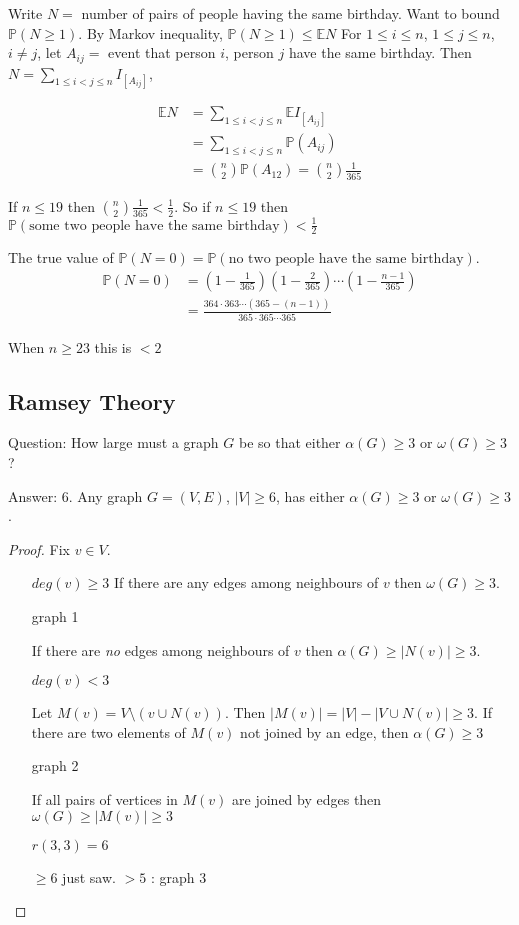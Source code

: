 \documentclass{article}
\begin{document}
Write $N=$ number of pairs of people having the same birthday.  Want to bound $\mathbb{P}(N \ge 1)$.  By Markov inequality, $\mathbb{P}(N \ge 1) \le \mathbb{E}N$  For $1 \le i \le n$, $1\le j \le n$, $i \neq j$, let $A_{ij}=$ event that person $i$, person $j$ have the same birthday.  Then $N = \displaystyle \sum_{1 \le i < j \le n}I_{[A_{ij}]}$, 

\begin{align*}
\mathbb{E}N &=   \sum_{1 \le i < j \le n} \mathbb{E} I_{[A_{ij}]} \\
&= \sum_{1 \le i < j \le n} \mathbb{P}(A_{ij}) \\
& = {n \choose 2} \mathbb{P}(A_{12}) = {n \choose 2} \frac{1}{365}
\end{align*}

If $n \le 19$ then ${n \choose2} \frac{1}{365} < \frac{1}{2}$.  So if $n \le 19$ then $\mathbb{P}(\text{some two people have the same birthday}) < \frac{1}{2}$

The true value of $\mathbb{P}(N=0) = \mathbb{P}(\text{no two people have the same birthday})$.  
\begin{align*}
\mathbb{P}(N=0) &= (1 - \frac{1}{365})(1 - \frac{2}{365}) \cdots (1 - \frac{n-1}{365}) \\
&= \frac{364 \cdot 363 \cdots (365-(n-1))}{365 \cdot 365 \cdots 365}
\end{align*}

When $n \ge 23$ this is $<2$

\subsection*{Ramsey Theory}

Question: How large must a graph $G$ be so that either $\alpha(G) \ge 3$ or $\omega(G) \ge 3$?

Answer: 6.  Any graph $G=(V,E)$, $|V| \ge 6$, has either $\alpha(G) \ge 3$ or $\omega(G) \ge 3$.

\begin{proof}
Fix $v \in V$.  
\begin{itemize}
\item[$deg(v) \ge 3$]
If there are any edges among neighbours of $v$ then $\omega(G) \ge 3$.

graph 1

If there are \emph{no} edges among neighbours of $v$ then $\alpha(G) \ge |N(v)| \ge 3$.
\item[$deg(v) <3$]

Let $M(v) = V \setminus (v \cup N(v))$.  Then $|M(v)| = |V| - |V \cup N(v) | \ge 3$.  If there are two elements of $M(v)$ not joined by an edge, then $\alpha(G) \ge 3$

graph 2

If all pairs of vertices in $M(v)$ are joined by edges then $\omega(G) \ge |M(v)| \ge 3$


\item[$r(3,3) = 6$]

$\ge 6$ just saw.  $>5$ : graph 3

\end{itemize}
\end{proof}
\end{document}
